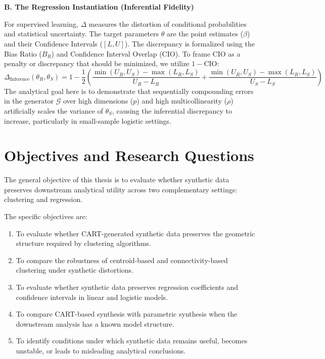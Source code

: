 \textbf{B. The Regression Instantiation (Inferential Fidelity)}

For supervised learning, $\Delta$ measures the distortion of conditional probabilities and statistical uncertainty. The target parameters $\theta$ are the point estimates ($\hat{\beta}$) and their Confidence Intervals ($[L, U]$). The discrepancy is formalized using the Bias Ratio ($B_{R}$) and Confidence Interval Overlap (CIO). To frame CIO as a penalty or discrepancy that should be minimized, we utilize $1 - \text{CIO}$:
\begin{equation}
    \Delta_{\text{Inference}}(\theta_{R}, \theta_{S}) = 1 - \frac{1}{2}\left(\frac{\min(U_{R},U_{S})-\max(L_{R},L_{S})}{U_{R}-L_{R}} + \frac{\min(U_{R},U_{S})-\max(L_{R},L_{S})}{U_{S}-L_{S}}\right)
\end{equation}
The analytical goal here is to demonstrate that sequentially compounding errors in the generator $\mathcal{G}$ over high dimensions ($p$) and high multicollinearity ($\rho$) artificially scales the variance of $\theta_{S}$, causing the inferential discrepancy to increase, particularly in small-sample logistic settings.

\section{Objectives and Research Questions}
\label{sec:general-objectives}

The general objective of this thesis is to evaluate whether synthetic data preserves downstream analytical utility across two complementary settings: clustering and regression.

The specific objectives are:
\begin{enumerate}
  \item To evaluate whether CART-generated synthetic data preserves the geometric structure required by clustering algorithms.
  \item To compare the robustness of centroid-based and connectivity-based clustering under synthetic distortions.
  \item To evaluate whether synthetic data preserves regression coefficients and confidence intervals in linear and logistic models.
  \item To compare CART-based synthesis with parametric synthesis when the downstream analysis has a known model structure.
  \item To identify conditions under which synthetic data remains useful, becomes unstable, or leads to misleading analytical conclusions.
\end{enumerate}

